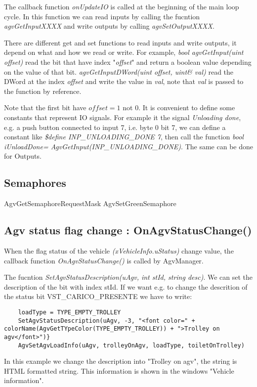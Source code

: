 The callback function \textit{onUpdateIO} is called at the beginning of the main loop cycle. In this function we can read inputs by calling the fucntion \textit{agvGetInputXXXX} and write outputs by calling \textit{agvSetOutputXXXX}.

There are different get and set functions to read inputs and write outputs, it depend on what and how we read or write. For example, \textit{bool agvGetInput(uint offset)} read the bit that have index "\textit{offset}" and return a boolean value depending on the value of that bit. \textit{agvGetInputDWord(uint offset, uint\& val)} read the DWord at the index \textit{offset} and write the value in \textit{val}, note that \textit{val} is passed to the function by reference.

Note that the first bit have $offset = 1$ not $0$. It is convenient to define some constants that represent IO signals. For example it the signal \textit{Unloading done}, e.g. a push button connected to input 7, i.e. byte 0 bit 7, we can define a constant like \textit{\$define INP\_UNLOADING\_DONE 7}, then call the function \textit{bool iUnloadDone= AgvGetInput(INP\_UNLOADING\_DONE)}. The same can be done for Outputs.

\subsection{Semaphores}
AgvGetSemaphoreRequestMask
AgvSetGreenSemaphore

\subsection{Agv status flag change : OnAgvStatusChange() }
When the flag status of the vehicle \textit{(xVehicleInfo.uStatus)} change value, the callback function \textit{OnAgvStatusChange()} is called by AgvManager.

The fucntion \textit{SetAgvStatusDescription(uAgv, int stId, string desc)}. We can set the description of the bit with index stId.
If we want e.g. to change the descrition of the status bit VST\_CARICO\_PRESENTE we have to write: 
\begin{lstlisting}
	loadType = TYPE_EMPTY_TROLLEY
	SetAgvStatusDescription(uAgv, -3, "<font color=" + colorName(AgvGetTYpeColor(TYPE_EMPTY_TROLLEY)) + ">Trolley on agv</font>")}
	AgvSetAgvLoadInfo(uAgv, trolleyOnAgv, loadType, toiletOnTrolley)
\end{lstlisting}

In this example we change the description into "Trolley on agv", the string is HTML formatted string. This information is shown in the windows "Vehicle information".


